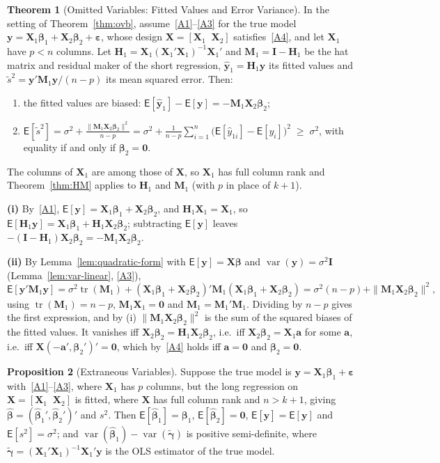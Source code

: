 \documentclass[12pt,a4paper]{article}
\makeatletter
\theoremstyle{definition}
\newtheorem{theorem}{Theorem}[section]
\newtheorem{proposition}[theorem]{Proposition}
\renewenvironment{proof}[1][\proofname]{\par
  \pushQED{\qed}%
  \normalfont \topsep6\p@\@plus6\p@\relax
  \trivlist
  \item[\hskip\labelsep\bfseries #1\@addpunct{.}]\ignorespaces
}{%
  \popQED\endtrivlist\@endpefalse
}
\newcommand\expc{\mathsf{E}}
\DeclareMathOperator\var{var}
\DeclareMathOperator\tr{tr}
\newcommand{\ds}{\displaystyle}
\newcommand{\bX}{\mathbf{X}}
\newcommand{\by}{\mathbf{y}}
\def\bb{\boldsymbol{\beta}}
\newcommand{\be}{\boldsymbol{\varepsilon}}
\newcommand{\bI}{\mathbf{I}}
\newcommand{\bH}{\mathbf{H}}
\newcommand{\bM}{\mathbf{M}}
\newcommand{\bzero}{\mathbf{0}}
\newcommand{\ba}{\mathbf{a}}
\makeatother
\begin{document}
\begin{theorem}[Omitted Variables: Fitted Values and Error Variance]\label{thm:ovb-fit}
In the setting of Theorem~\ref{thm:ovb}, assume~\ref{A1}--\ref{A3} for the true model $\by = \bX_1\bb_1 + \bX_2\bb_2 + \be$, whose design $\bX = [\bX_1 \;\; \bX_2]$ satisfies~\ref{A4}, and let $\bX_1$ have $p < n$ columns. Let $\bH_1 = \bX_1(\bX_1'\bX_1)^{-1}\bX_1'$ and $\bM_1 = \bI - \bH_1$ be the hat matrix and residual maker of the short regression, $\hat{\by}_1 = \bH_1\by$ its fitted values and $\tilde s^2 = \by'\bM_1\by/(n-p)$ its mean squared error. Then:
\begin{enumerate}[label=\textup{(\roman*)}]
\item the fitted values are biased: $\expc[\hat{\by}_1] - \expc[\by] = -\bM_1\bX_2\bb_2$;
\item\label{ovbfit:ii} $\ds\expc[\tilde s^2] = \sigma^2 + \frac{\|\bM_1\bX_2\bb_2\|^2}{n-p} = \sigma^2 + \frac{1}{n-p}\sum_{i=1}^n\bigl(\expc[\hat y_{1i}] - \expc[y_i]\bigr)^2 \;\geqslant\; \sigma^2$, with equality if and only if $\bb_2 = \bzero$.
\end{enumerate}
\end{theorem}

\begin{proof}
The columns of $\bX_1$ are among those of $\bX$, so $\bX_1$ has full column rank and Theorem~\ref{thm:HM} applies to $\bH_1$ and $\bM_1$ (with $p$ in place of $k + 1$).

\textbf{(i)} By~\ref{A1}, $\expc[\by] = \bX_1\bb_1 + \bX_2\bb_2$, and $\bH_1\bX_1 = \bX_1$, so $\expc[\bH_1\by] = \bX_1\bb_1 + \bH_1\bX_2\bb_2$; subtracting $\expc[\by]$ leaves $-(\bI - \bH_1)\bX_2\bb_2 = -\bM_1\bX_2\bb_2$.

\textbf{(ii)} By Lemma~\ref{lem:quadratic-form} with $\expc[\by] = \bX\bb$ and $\var(\by) = \sigma^2\bI$ (Lemma~\ref{lem:var-linear}, \ref{A3}),
\[
\expc[\by'\bM_1\by] = \sigma^2\tr(\bM_1) + (\bX_1\bb_1 + \bX_2\bb_2)'\bM_1(\bX_1\bb_1 + \bX_2\bb_2) = \sigma^2(n - p) + \|\bM_1\bX_2\bb_2\|^2,
\]
using $\tr(\bM_1) = n - p$, $\bM_1\bX_1 = \bzero$ and $\bM_1 = \bM_1'\bM_1$. Dividing by $n - p$ gives the first expression, and by (i) $\|\bM_1\bX_2\bb_2\|^2$ is the sum of the squared biases of the fitted values. It vanishes iff $\bX_2\bb_2 = \bH_1\bX_2\bb_2$, i.e.\ iff $\bX_2\bb_2 = \bX_1\ba$ for some $\ba$, i.e.\ iff $\bX(-\ba', \bb_2')' = \bzero$, which by~\ref{A4} holds iff $\ba = \bzero$ and $\bb_2 = \bzero$.
\end{proof}

\begin{proposition}[Extraneous Variables]\label{prop:extraneous}
Suppose the true model is $\by = \bX_1\bb_1 + \be$ with~\ref{A1}--\ref{A3}, where $\bX_1$ has $p$ columns, but the long regression on $\bX = [\bX_1 \;\; \bX_2]$ is fitted, where $\bX$ has full column rank and $n > k + 1$, giving $\hat{\bb} = (\hat{\bb}_1', \hat{\bb}_2')'$ and $s^2$. Then $\expc[\hat{\bb}_1] = \bb_1$, $\expc[\hat{\bb}_2] = \bzero$, $\expc[\hat{\by}] = \expc[\by]$ and $\expc[s^2] = \sigma^2$; and $\var(\hat{\bb}_1) - \var(\tilde{\boldsymbol\gamma})$ is positive semi-definite, where $\tilde{\boldsymbol\gamma} = (\bX_1'\bX_1)^{-1}\bX_1'\by$ is the OLS estimator of the true model.
\end{proposition}
\end{document}

